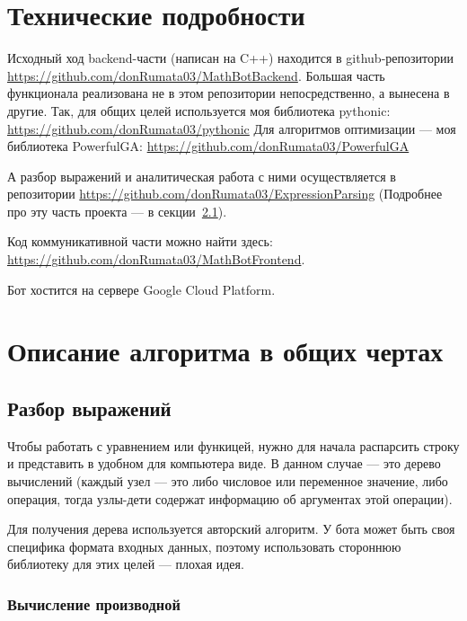 \documentclass[11pt]{article}
\begin{document}
    \section{Технические подробности}

    Исходный ход backend-части (написан на C++) находится в github-репозитории \url{https://github.com/donRumata03/MathBotBackend}.
    Большая часть функционала реализована не в этом репозитории непосредственно, а вынесена в другие.
    Так, для общих целей используется моя библиотека pythonic: \url{https://github.com/donRumata03/pythonic}
    Для алгоритмов оптимизации — моя библиотека PowerfulGA: \url{https://github.com/donRumata03/PowerfulGA}

    А разбор выражений и аналитическая работа с ними осуществляется в репозитории \url{https://github.com/donRumata03/ExpressionParsing}
    (Подробнее про эту часть проекта — в секции~\ref{subsec:expression-parsing}).

    Код коммуникативной части можно найти здесь: \url{https://github.com/donRumata03/MathBotFrontend}.

    Бот хостится на сервере Google Cloud Platform.

    \section{Описание алгоритма в общих чертах}

    \subsection{Разбор выражений}\label{subsec:expression-parsing}
    Чтобы работать с уравнением или функицей, нужно для начала распарсить строку и представить в удобном для компьютера виде.
    В данном случае — это дерево вычислений (каждый узел — это либо числовое или переменное значение, либо операция, тогда узлы-дети содержат информацию об аргументах этой операции).

    Для получения дерева используется авторский алгоритм.
    У бота может быть своя специфика формата входных данных, поэтому использовать стороннюю библиотеку для этих целей — плохая идея.

    \subsubsection{Вычисление производной}
\end{document}
